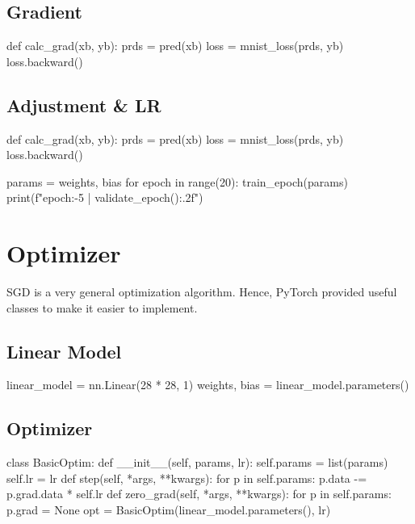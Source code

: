 \documentclass{article}
\newenvironment{monos}{\VerbatimEnvironment\begin{pythoncode}}{\end{pythoncode}}
\begin{document}
\subsection{Gradient}

\begin{monos}
def calc_grad(xb, yb):
    prds = pred(xb)
    loss = mnist_loss(prds, yb)
    loss.backward()
\end{monos}

\subsection{Adjustment \& LR}

\begin{monos}
def calc_grad(xb, yb):
    prds = pred(xb)
    loss = mnist_loss(prds, yb)
    loss.backward()

params = weights, bias
for epoch in range(20):
    train_epoch(params)
    print(f"{epoch:-5} | {validate_epoch():.2f}")
\end{monos}

\section{Optimizer}

SGD is a very general optimization algorithm. Hence, PyTorch provided useful classes to
make it easier to implement.

\subsection{Linear Model}

\begin{monos}
    linear_model = nn.Linear(28 * 28,  1)
    weights, bias = linear_model.parameters()
\end{monos}

\subsection{Optimizer}

\begin{monos}
    class BasicOptim:
    def __init__(self, params, lr):
        self.params = list(params)
        self.lr = lr
    def step(self, *args, **kwargs):
        for p in self.params:
            p.data -= p.grad.data * self.lr
    def zero_grad(self, *args, **kwargs):
        for p in self.params:
            p.grad = None
    opt = BasicOptim(linear_model.parameters(), lr)
\end{monos}
\end{document}
